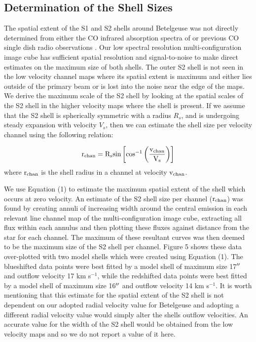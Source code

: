 \documentclass[apj]{emulateapj}
\begin{document}
\subsection{Determination of the Shell Sizes} \label{results3} 
The spatial extent of the S1 and S2 shells around Betelgeuse was not directly determined from either the CO infrared absorption spectra of \cite{1979ApJ...233L.135B} or previous CO single dish radio observations \citep{1980ApJ...242L..25K, 1987ApJ...313..400H, 1994ApJ...424L.127H}. Our low spectral resolution multi-configuration image cube has sufficient spatial resolution and signal-to-noise to make direct estimates on the maximum size of both shells. The outer S2 shell is not seen in the low velocity channel maps where its spatial extent is maximum and either lies outside of the primary beam or is lost into the noise near the edge of the maps. We derive the maximum scale of the S2 shell by looking at the spatial scales of the S2 shell in the higher velocity maps where the shell is present. If we assume that the S2 shell is spherically symmetric with a radius $R_{s}$, and is undergoing steady expansion with velocity $V_{s}$, then we can estimate the shell size per velocity channel using the following relation:

\begin{equation}
\rm{r_{chan}}=R_{s} \rm{sin}\left[\rm{cos}^{-1}\left(\frac{v_{chan}}{V_{s}}\right) \right]
\end{equation} 
where $\rm{r_{chan}}$ is the shell radius in a channel at velocity $\rm{v_{chan}}$. 

We use Equation (1) to estimate the maximum spatial extent of the shell which occurs at zero velocity. An estimate of the S2 shell size per channel ($\rm{r_{chan}}$) was found by creating annuli of increasing width around the central emission in each relevant line channel map of the multi-configuration image cube, extracting all flux within each annulus and then plotting these fluxes against distance from the star for each channel. The maximum of these resultant curves was then deemed to be the maximum size of the S2 shell per channel. Figure 5 shows these data over-plotted with two model shells which were created using Equation (1). The blueshifted data points were best fitted by a model shell of maximum size 17$\mbox{$^{\prime\prime}$}$ and outflow velocity 17 km s${}^{-1}$, while the redshifted data points were best fitted by a model shell of maximum size 16$\mbox{$^{\prime\prime}$}$ and outflow velocity 14 km s${}^{-1}$. It is worth mentioning that this estimate for the spatial extent of the S2 shell is not dependent on our adopted radial velocity value for Betelgeuse and adopting a different radial velocity value would simply alter the shells outflow velocities. An accurate value for the width of the S2 shell would be obtained from the low velocity maps and so we do not report a value of it here.
\end{document}

